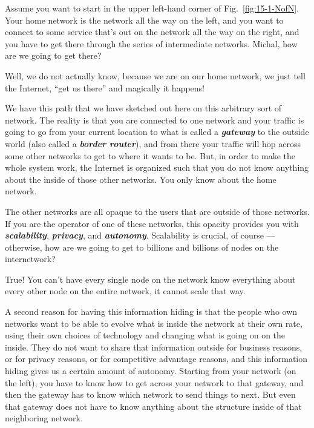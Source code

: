 Assume you want to start in the upper left-hand corner of Fig.~\ref{fig:15-1-NofN}. Your home network is the network all the way on the left, and you want to connect to some service that's out on the network all the way on the right, and you have to get there through the series of intermediate networks. Michal, how are we going to get there?

\mmm Well, we do not actually know, because we are on our home network, we just tell the Internet, ``get us there'' and magically it happens!

\rrr We have this path that we have sketched out here on this arbitrary sort of network. The reality is that you are connected to one network and your traffic is going to go from your current location to what is called a \textbf{\emph{gateway}} to the outside world (also called a \textbf{\emph{border router}}), and from there your traffic will hop across some other networks to get to where it wants to be. But, in order to make the whole system work, the Internet is organized such that you do not know anything about the inside of those other networks. You only know about the home network.

The other networks are all opaque to the users that are outside of those networks. If you are the operator of one of these networks, this opacity provides you with \textbf{\emph{scalability}}, \textbf{\emph{privacy}}, and \textbf{\emph{autonomy}}. Scalability is crucial, of course --- otherwise, how are we going to get to billions and billions of nodes on the internetwork?

\mmm True! You can't have every single node on the network know everything about every other node on the entire network, it cannot scale that way.

\rrr A second reason for having this information hiding is that the people who own networks want to be able to evolve what is inside the network at their own rate, using their own choices of technology and changing what is going on on the inside. They do not want to share that information outside for business reasons, or for privacy reasons, or for competitive advantage reasons, and this information hiding gives us a certain amount of autonomy. Starting from your network (on the left), you have to know how to get across your network to that gateway, and then the gateway has to know which network to send things to next. But even that gateway does not have to know anything about the structure inside of that neighboring network.

